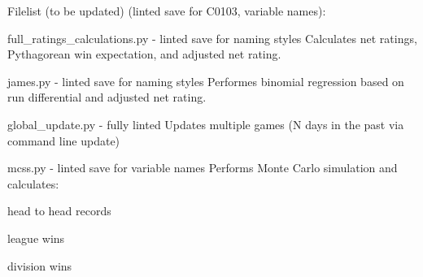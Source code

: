 Filelist (to be updated) (linted save for C0103, variable names)\+:
\begin{DoxyEnumerate}
\item full\+\_\+ratings\+\_\+calculations.\+py -\/ linted save for naming styles Calculates net ratings, Pythagorean win expectation, and adjusted net rating.
\item james.\+py -\/ linted save for naming styles Performes binomial regression based on run differential and adjusted net rating.
\item global\+\_\+update.\+py -\/ fully linted Updates multiple games (N days in the past via command line update)
\end{DoxyEnumerate}
\begin{DoxyEnumerate}
\item mcss.\+py -\/ linted save for variable names Performs Monte Carlo simulation and calculates\+:
\end{DoxyEnumerate}
\begin{DoxyItemize}
\item head to head records
\item league wins
\item division wins
\end{DoxyItemize}
